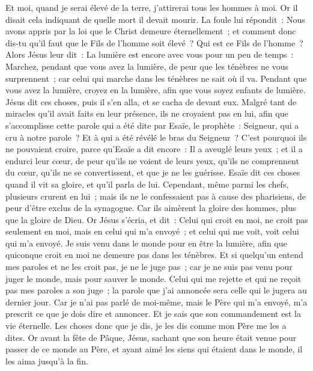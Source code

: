 \begin{multicols}{2}
Et moi, quand je serai élevé de la terre, j'attirerai tous les hommes à moi.
Or il disait cela indiquant de quelle mort il devait mourir.
La foule lui répondit~: Nous avons appris par la loi que le Christ demeure éternellement~; et comment donc dis-tu qu'il faut que le Fils de l'homme soit élevé~? Qui est ce Fils de l'homme~?
Alors Jésus leur dit~: La lumière est encore avec vous pour un peu de temps~: Marchez, pendant que vous avez la lumière, de peur que les ténèbres ne vous surprennent~; car celui qui marche dans les ténèbres ne sait où il va.
Pendant que vous avez la lumière, croyez en la lumière, afin que vous soyez enfants de lumière. Jésus dit ces choses, puis il s'en alla, et se cacha de devant eux.
Malgré tant de miracles qu'il avait faits en leur présence, ils ne croyaient pas en lui,
afin que s'accomplisse cette parole qui a été dite par Esaïe, le prophète~: Seigneur, qui a cru à notre parole~? Et à qui a été révélé le bras du Seigneur~?
C'est pourquoi ils ne pouvaient croire, parce qu'Esaïe a dit encore~:
Il a aveuglé leurs yeux~; et il a endurci leur cœur, de peur qu'ils ne voient de leurs yeux, qu'ils ne comprennent du cœur, qu'ils ne se convertissent, et que je ne les guérisse.
Esaïe dit ces choses quand il vit sa gloire, et qu'il parla de lui.
Cependant, même parmi les chefs, plusieurs crurent en lui~; mais ils ne le confessaient pas à cause des pharisiens, de peur d'être exclus de la synagogue.
Car ils aimèrent la gloire des hommes, plus que la gloire de Dieu.
Or Jésus s'écria, et dit~: Celui qui croit en moi, ne croit pas seulement en moi, mais en celui qui m'a envoyé~;
et celui qui me voit, voit celui qui m'a envoyé.
Je suis venu dans le monde pour en être la lumière, afin que quiconque croit en moi ne demeure pas dans les ténèbres.
Et si quelqu'un entend mes paroles et ne les croit pas, je ne le juge pas~; car je ne suis pas venu pour juger le monde, mais pour sauver le monde.
Celui qui me rejette et qui ne reçoit pas mes paroles a son juge~; la parole que j'ai annoncée sera celle qui le jugera au dernier jour.
Car je n'ai pas parlé de moi-même, mais le Père qui m'a envoyé, m'a prescrit ce que je dois dire et annoncer.
Et je sais que son commandement est la vie éternelle. Les choses donc que je dis, je les dis comme mon Père me les a dites.
\VerseOne{}Or avant la fête de Pâque, Jésus, sachant que son heure était venue pour passer de ce monde au Père, et ayant aimé les siens qui étaient dans le monde, il les aima jusqu'à la fin.

\end{multicols}
